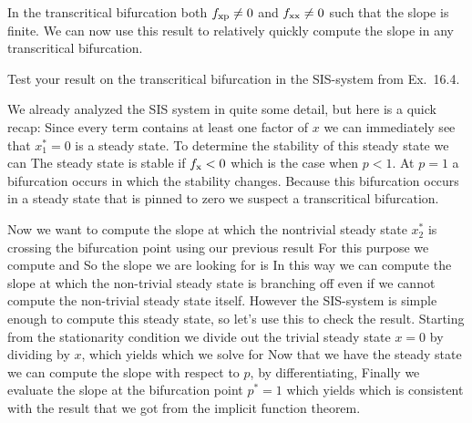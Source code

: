 In the transcritical bifurcation both $f_{\rm xp}\neq 0$ and $f_{\rm xx}\neq 0$ such that the slope is finite. We can now use this result to relatively quickly compute the slope in any transcritical bifurcation. 

\subquestion 
Test your result on the transcritical bifurcation in the SIS-system from Ex.~16.4.

\solution 
We already analyzed the SIS system in quite some detail, but here is a quick recap: Since every term contains at least one factor of $x$ we can immediately see that $x_1^*=0$ is a steady state. To determine the stability of this steady state we can  
The steady state is stable if $f_{\rm x}<0$ which is the case when $p<1$. At $p=1$ a bifurcation occurs in which the stability changes. Because this bifurcation occurs in a steady state that is pinned to zero we suspect a transcritical bifurcation. 

Now we want to compute the slope at which the nontrivial steady state $x_2^*$ is crossing the bifurcation point using our previous result 
For this purpose we compute 
and 
So the slope we are looking for is 
In this way we can compute the slope at which the non-trivial steady state is branching off even if we cannot compute the non-trivial steady state itself. 
However the SIS-system is simple enough to compute this steady state, so let's use this to check the result. Starting from the stationarity condition 
we divide out the trivial steady state $x=0$ by dividing by $x$, which yields 
which we solve for 
Now that we have the steady state we can compute the slope with respect to $p$, by differentiating, 
Finally we evaluate the slope at the bifurcation point $p^*=1$ which yields 
which is consistent with the result that we got from the implicit function theorem. 